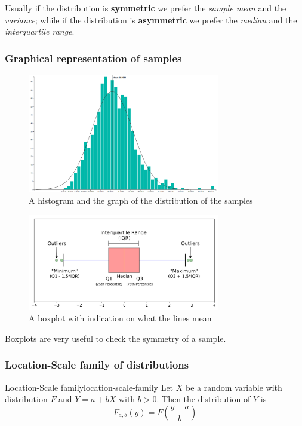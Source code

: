 \documentclass[12pt]{extarticle}
\begin{document}
Usually if the distribution is \textbf{symmetric} we prefer the \textit{sample mean} and the \textit{variance}; while if the distribution is \textbf{asymmetric} we prefer the \textit{median} and the \textit{interquartile range}.

\subsubsection{Graphical representation of samples}

\begin{figure}[H]
	\centering
	\includegraphics[width=0.75\textwidth]{assets/statistics/histogram.png}
	\caption{A histogram and the graph of the distribution of the samples}
\end{figure}

\begin{figure}[H]
	\centering
	\includegraphics[width=0.75\textwidth]{assets/statistics/boxplot.png}
	\caption{A boxplot with indication on what the lines mean}
\end{figure}

Boxplots are very useful to check the symmetry of a sample.

\subsubsection{Location-Scale family of distributions}

\begin{definition}{Location-Scale family}{location-scale-family}
	Let $X$ be a random variable with distribution $F$ and $Y = a + bX$ with $b>0$.
	Then the distribution of $Y$ is
	\begin{equation}
		F_{a, b}(y) = F\left( \frac{y-a}{b} \right)
	\end{equation}
\end{definition}
\end{document}
